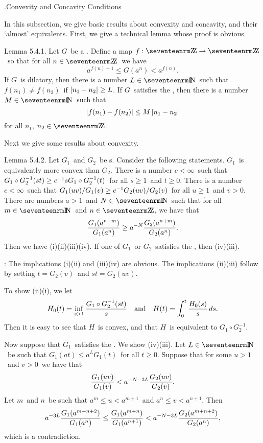 .\enspace Convexity and Concavity Conditions

In this subsection, we give basic results about convexity and concavity, and
their `almost' equivalents. First, we give a technical lemma whose proof is
obvious.

\proclaim Lemma 5.4.1. Let $G$\ be a \phifunction. Define a map $f:\Z\to\Z$\
so that for all $n\in\Z$\ we have
$$ a^{f(n)-1} \le G(a^n) < a^{f(n)} .$$
\itemi If $G$\ is dilatory, then there is a number $L\in\N$\ such that
$f(n_1) \ne f(n_2)$\ if $\left| n_1-n_2 \right| \ge L$.
\itemii If $G$\ satisfies the \Deltacond, then there is a number $M\in\N$\ such
that 
$$ \left| f(n_1)-f(n_2) \right| \le M\left| n_1-n_2 \right| $$
for all $n_1$, $n_2\in\Z$.
\moreproclaim

Next we give some results about convexity.

\proclaim Lemma 5.4.2. Let $G_1$\ and $G_2$\ be \phifunction s. Consider the
following statements.
\itemi $G_1$\ is equivalently more convex than $G_2$.
\itemii There is a number $c<\infty$\ such that $G_1\circ G_2^{-1}(st) \ge
{c^{-1}} s G_1\circ G_2^{-1}(t) $\ for all $s\ge1$\ and $t\ge0$.
\itemiii There is a number $c<\infty$\ such that $G_1(uv)/G_1(v) \ge {c^{-1}}
G_2(uv)/G_2(v)$\ for all $u\ge1$\ and $v>0$.
\itemiv There are numbers $a>1$\ and $N\in\N$\ such that for all $m\in\N$\ and
$n\in\Z$, we have that
$$ {G_1(a^{n+m}) \over G_1(a^n)} \ge a^{-N} {G_2(a^{n+m}) \over G_2(a^n)} .$$
\moreproclaim\noindent
Then we have (i)\iff(ii)\iff(iii)\implies(iv). If one of $G_1$\ or $G_2$\
satisfies the \Deltacond, then (iv)\implies(iii).

\Proof: The implications (i)\implies(ii) and (iii)\implies(iv) are obvious. The
implications (ii)\iff(iii) follow by setting $t=G_2(v)$\ and $st = G_2(uv)$. 

To
show (ii)\implies(i), we let 
$$ H_0(t) = \inf_{s>1} {G_1\circ G_2^{-1}(st) \over s} 
   \quad\hbox{and}\quad
   H(t) = \int_0^t {H_0(s)\over s} \,ds .$$
Then it is easy to see that $H$\ is convex, and that
$H$\ is equivalent to $G_1\circ G_2^{-1}$.

Now suppose that $G_1$\ 
satisfies the \Deltacond. We show (iv)\implies(iii).
Let $L\in\N$\ be such that $G_1(at) \le a^L G_1(t)$\ for all
$t\ge0$. Suppose that for some $u>1$\ and $v>0$\ we have that
$$ {G_1(uv) \over G_1(v)} < a^{-N-3L} {G_2(uv) \over G_2(v)} .$$
Let $m$\ and $n$\ be such that
$ a^m \le u < a^{m+1} $\ and $ a^n \le v < a^{n+1} $. Then
$$ a^{-3L} {G_1(a^{m+n+2}) \over G_1(a^n)}
   \le
   {G_1(a^{m+n}) \over G_1(a^{n+1})}
   <
   a^{-N-3L} {G_2(a^{m+n+2}) \over G_2(a^n)} ,$$
which is a contradiction.

